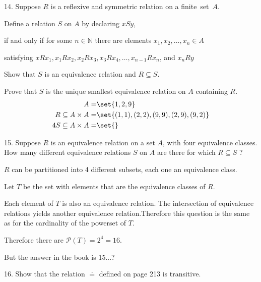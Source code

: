 \documentclass{hippoidC}
\begin{document}
\begin{prooflist}{14. Suppose $R$ is a reflexive and symmetric relation on a
    \mbox{finite set $A$.}}
\item Define a relation $S$ on $A$ by declaring $x S y$,
\item if and only if for some $n \in \mathbb{N}$ there are elements $x_1, x_2, \ldots, x_n \in A$
\item satisfying $x R x_1, x_1 R x_2, x_2 R x_3, x_3 R x_4, \ldots, x_{n-1} R x_n$, and $x_n R y$
\item Show that $S$ is an equivalence relation and $R \subseteq S$.
\item Prove that $S$ is the unique smallest equivalence relation on $A$ containing $R$.
    \begin{align*}
        A=&\set{1, 2, 9}\\
        R\subseteq A\times A=&\set{(1, 1), (2, 2), (9, 9), (2, 9), (9, 2)}\\
        4S\subseteq A\times A=&\set{}
    \end{align*}
\end{prooflist}

\begin{prooflist}{15. Suppose $R$ is an equivalence relation on a set $A$, with
four equivalence classes. How many different equivalence relations $S$ on $A$
are there for which $R \subseteq S$ ?}
\item $R$ can be partitioned into 4 different subsets, each one an equivalence
    class.
\item Let $T$ be the set with elements that are the equivalence classes of $R$.
\item Each element of $T$ is also an equivalence relation. The
    intersection of equivalence relations yields another equivalence
    relation.Therefore this question is the same as for the cardinality of the
    powerset of $T$.
\item Therefore there are $\mathscr{P}(T) = 2^4 = 16$.
\item But the answer in the book is 15...?
\end{prooflist}

\begin{prooflist}{16. Show that the relation $\doteq$ defined on page 213 is
transitive.} \item \end{prooflist}
\end{document}
